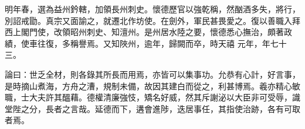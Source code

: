 \begin{pinyinscope}
 明年春，選為益州鈐轄，加領長州刺史。懷德歷官以強乾稱，然酗酒多失，將行，別詔戒勖。真宗又面諭之，就遷北作坊使。在劍外，軍民甚畏愛之。復以善職入拜西上閣門使，改領昭州刺史、知澶州。是州居水陸之要，懷德悉心撫治，頗著政績，使車往復，多稱譽焉。又知陜州，逾年，歸闕而卒，時天禧
 元年，年七十三。



 論曰：世乏全材，則各錄其所長而用焉，亦皆可以集事功。允恭有心計，好言事，是時摘山煮海，方舟之漕，規制未備，故因其建白而從之，利甚博焉。羲亦精心敏職，士大夫許其醞藉。德權清廉強忮，矯名好威，然其斥謝泌以大臣非可受辱，識堂陛之分，長者之言哉。延德而下，遘會進陟，迭居事任，其指使治跡，各有可取者焉。



\end{pinyinscope}
